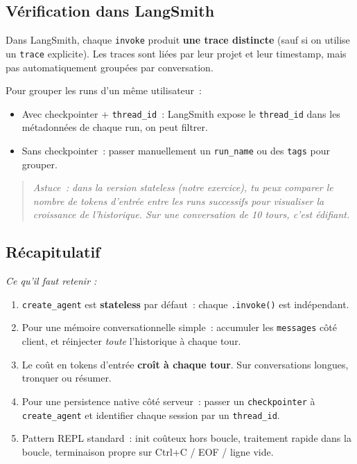 \documentclass[11pt,a4paper]{article}
\begin{document}
\subsection{Vérification dans LangSmith}

Dans LangSmith, chaque \texttt{invoke} produit \textbf{une trace
distincte} (sauf si on utilise un \texttt{trace} explicite). Les traces
sont liées par leur projet et leur timestamp, mais pas automatiquement
groupées par conversation.

Pour grouper les runs d'un même utilisateur~:

\begin{itemize}[leftmargin=*]
  \item Avec checkpointer + \texttt{thread\_id}~: LangSmith expose le
        \texttt{thread\_id} dans les métadonnées de chaque run, on peut
        filtrer.
  \item Sans checkpointer~: passer manuellement un \texttt{run\_name} ou
        des \texttt{tags} pour grouper.
\end{itemize}

\begin{quote}\itshape
Astuce~: dans la version stateless (notre exercice), tu peux comparer
le \emph{nombre de tokens d'entrée} entre les runs successifs pour
visualiser la croissance de l'historique. Sur une conversation de 10
tours, c'est édifiant.
\end{quote}

\subsection*{Récapitulatif}
{\itshape\sloppy
\textit{Ce qu'il faut retenir :}
\begin{enumerate}[leftmargin=*]
  \item \texttt{create\_agent} est \textbf{stateless} par défaut~:
        chaque \texttt{.invoke()} est indépendant.
  \item Pour une mémoire conversationnelle simple~: accumuler les
        \texttt{messages} côté client, et réinjecter \emph{toute}
        l'historique à chaque tour.
  \item Le coût en tokens d'entrée \textbf{croît à chaque tour}. Sur
        conversations longues, tronquer ou résumer.
  \item Pour une persistence native côté serveur~: passer un
        \texttt{checkpointer} à \texttt{create\_agent} et identifier
        chaque session par un \texttt{thread\_id}.
  \item Pattern REPL standard~: init coûteux hors boucle, traitement
        rapide dans la boucle, terminaison propre sur Ctrl+C / EOF /
        ligne vide.
\end{enumerate}
\par}
\end{document}
